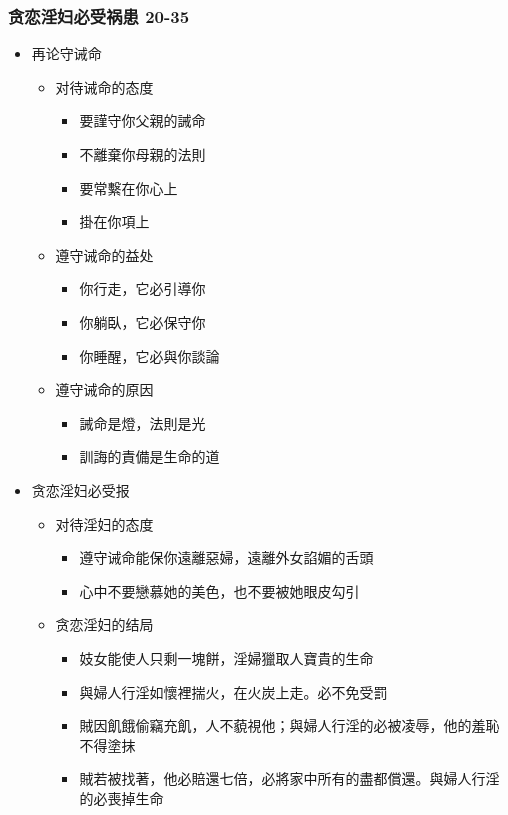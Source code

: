\subsubsection{贪恋淫妇必受祸患 20-35}
\begin{itemize}
\itemsep-.45em  
\item 再论守诫命 
\begin{itemize}
\itemsep-.45em  
\item 对待诫命的态度
\begin{itemize}
\itemsep-.45em  
\item 要謹守你父親的誡命
\item 不離棄你母親的法則
\item 要常繫在你心上 
\item 掛在你項上
\end{itemize}
\item 遵守诫命的益处
\begin{itemize}
\itemsep-.45em  
\item 你行走，它必引導你
\item 你躺臥，它必保守你
\item 你睡醒，它必與你談論
\end{itemize}
\item 遵守诫命的原因
\begin{itemize}
\itemsep-.45em  
\item 誡命是燈，法則是光
\item 訓誨的責備是生命的道
\end{itemize}
\end{itemize}
\item 贪恋淫妇必受报
\begin{itemize}
\itemsep-.45em  
\item 对待淫妇的态度
\begin{itemize}
\itemsep-.45em  
\item 遵守诫命能保你遠離惡婦，遠離外女諂媚的舌頭
\item 心中不要戀慕她的美色，也不要被她眼皮勾引
\end{itemize}
\item 贪恋淫妇的结局
\begin{itemize}
\itemsep-.45em  
\item 妓女能使人只剩一塊餅，淫婦獵取人寶貴的生命
\item 與婦人行淫如懷裡揣火，在火炭上走。必不免受罰
\item 賊因飢餓偷竊充飢，人不藐視他；與婦人行淫的必被凌辱，他的羞恥不得塗抹
\item 賊若被找著，他必賠還七倍，必將家中所有的盡都償還。與婦人行淫的必喪掉生命
\end{itemize}
\end{itemize} 
\end{itemize}

